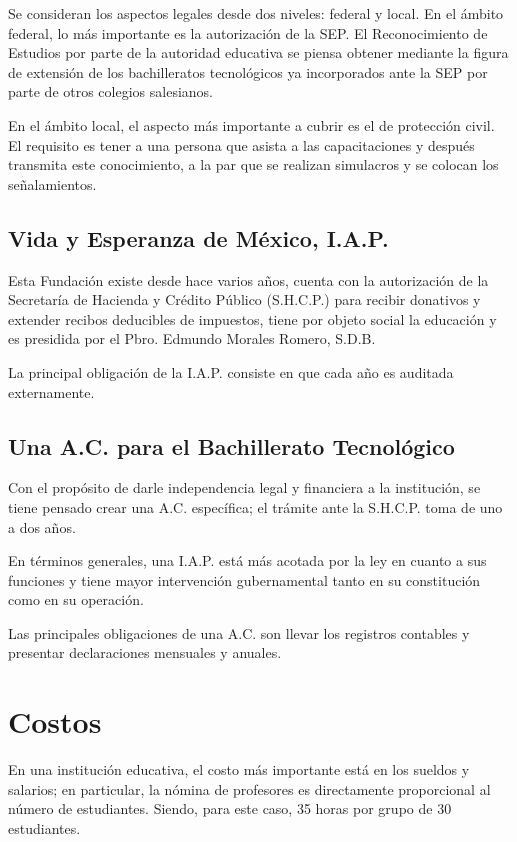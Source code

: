 Se consideran los aspectos legales desde dos niveles: federal y local. En el ámbito federal, lo más importante es la autorización de la SEP. El Reconocimiento de Estudios por parte de la autoridad educativa se piensa obtener mediante la figura de extensión de los bachilleratos tecnológicos ya incorporados ante la SEP por parte de otros colegios salesianos.

En el ámbito local, el aspecto más importante a cubrir es el de protección civil. El requisito es tener a una persona que asista a las capacitaciones y después transmita este conocimiento, a la par que se realizan simulacros y se colocan los señalamientos.

\subsection{Vida y Esperanza de México, I.A.P.}

Esta Fundación existe desde hace varios años, cuenta con la autorización de la Secretaría de Hacienda y Crédito Público (S.H.C.P.) para recibir donativos y extender recibos deducibles de impuestos, tiene por objeto social la educación y es presidida por el Pbro. Edmundo Morales Romero, S.D.B.

La principal obligación de la I.A.P. consiste en que cada año es auditada externamente.

\subsection{Una A.C. para el Bachillerato Tecnológico}

Con el propósito de darle independencia legal y financiera a la institución, se tiene pensado crear una A.C. específica; el trámite ante la S.H.C.P. toma de uno a dos años.

En términos generales, una I.A.P. está más acotada por la ley en cuanto a sus funciones y tiene mayor intervención gubernamental tanto en su constitución como en su operación.

Las principales obligaciones de una A.C. son llevar los registros contables y presentar declaraciones mensuales y anuales.

\section{Costos}
\label{sec:Costos}

En una institución educativa, el costo más importante está en los sueldos y salarios; en particular, la nómina de profesores es directamente proporcional al número de estudiantes. Siendo, para este caso, 35 horas por grupo de 30 estudiantes.

